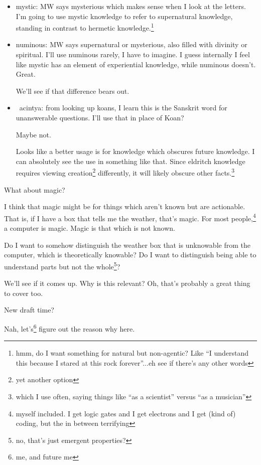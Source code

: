 \documentclass[12pt]{article}
\newcommand{\say}[1]{``#1''}
\renewcommand{\,}{\textsuperscript{,}}
\begin{document}
\begin{itemize}
\item mystic: MW says mysterious which makes sense when I look at the letters.  
I'm going to use mystic knowledge to refer to supernatural knowledge, standing in contrast to hermetic knowledge.\footnote{hmm, do I want something for natural but non-agentic? Like \say{I understand this because I stared at this rock forever}...eh see if there's any other words}

\item numinous: MW says supernatural or mysterious, also filled with divinity or spiritual.  
I'll use numinous rarely, I have to imagine.  
I guess internally I feel like mystic has an element of experiential knowledge, while numinous doesn't.  
Great.

We'll see if that difference bears out.

\item acintya: from looking up koans, I learn this is the Sanskrit word for unanswerable questions.  
I'll use that in place of Koan?

Maybe not.

Looks like a better usage is for knowledge which obscures future knowledge.  
I can absolutely see the use in something like that.  
Since eldritch knowledge requires viewing creation\footnote{yet another option} differently, it will likely obscure other facts.\footnote{which I use often, saying things like \say{as a scientist} versus \say{as a musician}}

\end{itemize}

What about magic?

I think that magic might be for things which aren't known but are actionable.  
That is, if I have a box that tells me the weather, that's magic.  
For most people,\footnote{myself included. I get logic gates and I get electrons and I get (kind of) coding, but the in between terrifying} a computer is magic.  
Magic is that which is not known.

Do I want to somehow distinguish the weather box that is unknowable from the computer, which is theoretically knowable?  
Do I want to distinguish being able to understand parts but not the whole\footnote{no, that's just emergent properties?}?

We'll see if it comes up.  
Why is this relevant?  
Oh, that's probably a great thing to cover too.

New draft time?

Nah, let's\footnote{me, and future me} figure out the reason why here.
\end{document}
